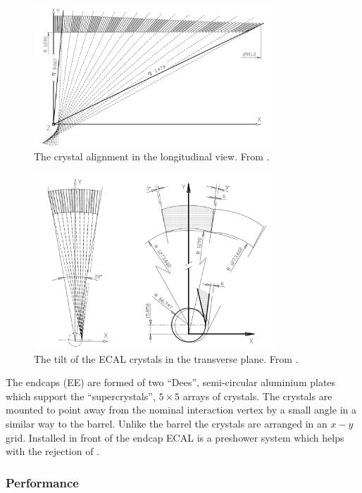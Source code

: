 \begin{figure}[htbp]
  \centering
  \includegraphics[width=0.8\textwidth]{crystallong}
  \caption{The crystal alignment in the longitudinal view. From \cite{ecal1997technical}.}
  \label{fig:crystallong}
\end{figure}

\begin{figure}[htbp]
  \centering
  \includegraphics[width=0.8\textwidth]{crystaltilt}
  \caption{The tilt of the ECAL crystals in the transverse plane. From \cite{ecal1997technical}.}
  \label{fig:crystaltilt}
\end{figure}

The endcaps (EE) are formed of two ``Dees'', semi-circular aluminium plates
which support the ``supercrystals'', $5\times5$ arrays of crystals. The crystals are
mounted to point away from the nominal interaction vertex by a small angle in a similar way
to the barrel. 
Unlike the barrel the crystals are arranged in an $x-y$ grid.
Installed in front of the endcap ECAL is a preshower system which helps with
the rejection of \Ppizero \cite{chatrchyan2008cms}.

\subsubsection{Performance}

